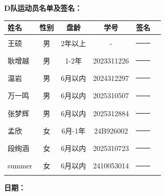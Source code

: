 \documentclass{article}
\begin{document}
\noindent \textbf{D队运动员名单及签名：} \\
\begin{center}
\small %
\renewcommand{\arraystretch}{1.5} %
\begin{tabular}{lccccl}
    \toprule
    \textbf{姓名} & \textbf{性别} & \textbf{盘龄} & \textbf{学号} & \textbf{签名} \\[3pt] %
    \midrule
    王硕 & 男 & 2年以上 & - & \rule{3cm}{0.4pt} \\
    耿增越 & 男 & 1-2年 & 2023311226 & \rule{3cm}{0.4pt} \\
    温岩 & 男 & 6月以内 & 2024312297 & \rule{3cm}{0.4pt} \\
    万一鸣 & 男 & 6月以内 & 2025310507 & \rule{3cm}{0.4pt} \\
    张梦辉 & 男 & 6月以内 & 2025312884 & \rule{3cm}{0.4pt} \\
    孟欣 & 女 & 6月-1年 & 24B926002 & \rule{3cm}{0.4pt} \\
    段绚涵 & 女 & 6月以内 & 2025310723 & \rule{3cm}{0.4pt} \\
    summer & 女 & 6月以内 & 2410053014 & \rule{3cm}{0.4pt} \\
    \bottomrule
\end{tabular}
\end{center}

\vspace{0.5cm} %
\noindent \textbf{日期：}
\end{document}
